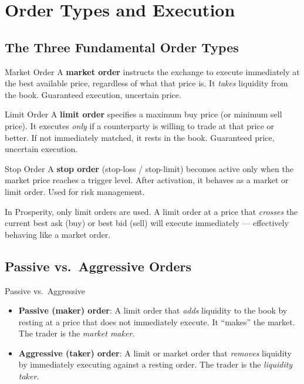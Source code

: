 \documentclass[12pt,a4paper,openany]{report}
\theoremstyle{definition}
\begin{document}
\chapter{Order Types and Execution}

\section{The Three Fundamental Order Types}

\begin{definitionbox}{Market Order}
A \textbf{market order} instructs the exchange to execute immediately at the best available price, regardless of what that price is. It \emph{takes} liquidity from the book. Guaranteed execution, uncertain price.
\end{definitionbox}

\begin{definitionbox}{Limit Order}
A \textbf{limit order} specifies a maximum buy price (or minimum sell price). It executes \emph{only} if a counterparty is willing to trade at that price or better. If not immediately matched, it rests in the book. Guaranteed price, uncertain execution.
\end{definitionbox}

\begin{definitionbox}{Stop Order}
A \textbf{stop order} (stop-loss / stop-limit) becomes active only when the market price reaches a trigger level. After activation, it behaves as a market or limit order. Used for risk management.
\end{definitionbox}

\noindent In Prosperity, only limit orders are used. A limit order at a price that \emph{crosses} the current best ask (buy) or best bid (sell) will execute immediately — effectively behaving like a market order.

\section{Passive vs.\ Aggressive Orders}

\begin{keyconceptbox}{Passive vs.\ Aggressive}
\begin{itemize}
  \item \textbf{Passive (maker) order}: A limit order that \emph{adds} liquidity to the book by resting at a price that does not immediately execute. It ``makes'' the market. The trader is the \emph{market maker}.
  \item \textbf{Aggressive (taker) order}: A limit or market order that \emph{removes} liquidity by immediately executing against a resting order. The trader is the \emph{liquidity taker}.
\end{itemize}
\end{keyconceptbox}
\end{document}
